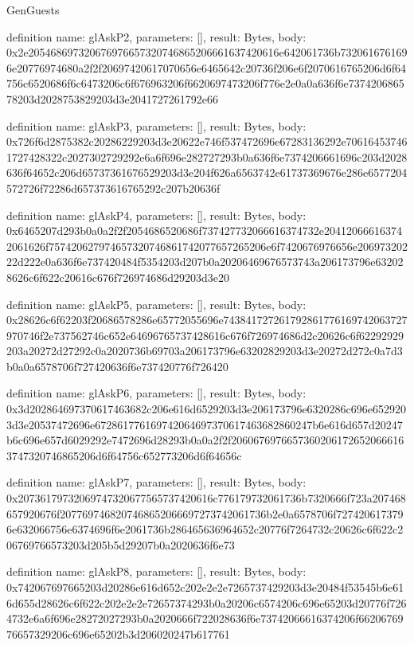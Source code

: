 \begin{lexlean}{GenGuests}
\begin{semanticmodule}
definition{
  name: glAskP2,
  parameters: [],
  result: Bytes,
  body: 0x2e205468697320676976657320746865206661637420616e642061736b7320616761696e20776974680a2f2f20697420617070656e6465642c20736f206e6f2070616765206d6f64756c6520686f6c6473206c6f676963206f6620697473206f776e2e0a0a636f6e737420686578203d2028753829203d3e2041727261792e66
}

definition{
  name: glAskP3,
  parameters: [],
  result: Bytes,
  body: 0x726f6d2875382c20286229203d3e20622e746f537472696e67283136292e706164537461727428322c2027302729292e6a6f696e282727293b0a636f6e7374206661696c203d2028636f64652c206d65737361676529203d3e204f626a6563742e61737369676e286e6577204572726f72286d657373616765292c207b20636f
}

definition{
  name: glAskP4,
  parameters: [],
  result: Bytes,
  body: 0x6465207d293b0a0a2f2f2054686520686f737427732066616374732e204120666163742061626f757420627974657320746861742077657265206e6f7420676976656e20697320222d222e0a636f6e737420484f5354203d207b0a20206469676573743a206173796e632028626c6f622c20616c676f726974686d29203d3e20
}

definition{
  name: glAskP5,
  parameters: [],
  result: Bytes,
  body: 0x28626c6f62203f20686578286e65772055696e743841727261792861776169742063727970746f2e737562746c652e64696765737428616c676f726974686d2c20626c6f62292929203a20272d27292c0a2020736b69703a206173796e63202829203d3e20272d272c0a7d3b0a0a6578706f727420636f6e737420776f726420
}

definition{
  name: glAskP6,
  parameters: [],
  result: Bytes,
  body: 0x3d202864697370617463682c206e616d6529203d3e206173796e6320286c696e6529203d3e20537472696e672861776169742064697370617463682860247b6e616d657d20247b6c696e657d6029292e7472696d28293b0a0a2f2f20606769766573602061726520666163747320746865206d6f64756c652773206d6f64656c
}

definition{
  name: glAskP7,
  parameters: [],
  result: Bytes,
  body: 0x20736179732069747320677565737420616c776179732061736b7320666f723a207468657920676f2077697468207468652066697273742061736b2e0a6578706f7274206173796e632066756e6374696f6e2061736b286465636964652c20776f7264732c20626c6f622c206769766573203d205b5d29207b0a2020636f6e73
}

definition{
  name: glAskP8,
  parameters: [],
  result: Bytes,
  body: 0x742067697665203d20286e616d652c202e2e2e7265737429203d3e20484f53545b6e616d655d28626c6f622c202e2e2e72657374293b0a20206c6574206c696e65203d20776f7264732e6a6f696e28272027293b0a2020666f722028636f6e73742066616374206f6620676976657329206c696e65202b3d206020247b617761
}


\end{semanticmodule}
\end{lexlean}
